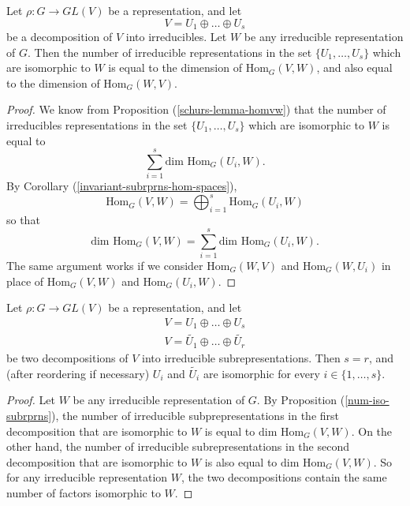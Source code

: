 \begin{prop}\label{num-iso-subrprns}
Let $\rho \colon G \to GL(V)$ be a representation, and let \[ V = U_1 \oplus \ldots \oplus U_s \] be a decomposition of $V$ into irreducibles.  Let $W$ be any irreducible representation of $G$.  Then the number of irreducible representations in the set  $ \{ U_1, \ldots, U_s \}$ which are isomorphic to $W$ is equal to the dimension of $\text{Hom}_G(V,W)$, and also equal to the dimension of $\text{Hom}_G(W,V)$.
\end{prop}
\begin{proof}
We know from Proposition (\ref{schurs-lemma-homvw}) that the number of irreducibles representations in the set  $ \{ U_1, \ldots, U_s \}$ which are isomorphic to $W$ is equal to \[ \sum_{i=1}^s \text{dim Hom}_G(U_i,W). \]
By Corollary (\ref{invariant-subrprns-hom-spaces}), \[ \text{Hom}_G(V,W) = \bigoplus_{i=1}^s \text{Hom}_G(U_i, W) \]
so that \[  \text{dim Hom}_G(V,W) = \sum_{i=1}^s \text{dim Hom}_G(U_i, W). \]
The same argument works if we consider $\text{Hom}_G(W,V)$ and $\text{Hom}_G(W,U_i)$ in place of $\text{Hom}_G(V,W)$ and $\text{Hom}_G(U_i,W)$.
\end{proof}

\begin{thm}\label{uniqueness-of-irr-decomp}
Let $\rho \colon G \to GL(V)$ be a representation, and let
\begin{align*}
V = U_1 \oplus \ldots \oplus U_s \\
V = \widetilde{U_1} \oplus \ldots \oplus \widetilde{U_r}
\end{align*}
be two decompositions of $V$ into irreducible subrepresentations.  Then $s = r$, and (after reordering if necessary) $U_i$ and $\widetilde{U_i}$ are isomorphic for every $i \in \{1, \ldots, s\}$.
\end{thm}
\begin{proof}
Let $W$ be any irreducible representation of $G$.  By Proposition (\ref{num-iso-subrprns}), the number of irreducible subprepresentations in the first decomposition that are isomorphic to $W$ is equal to $\text{dim Hom}_G(V,W)$.  On the other hand, the number of irreducible subrepresentations in the second decomposition that are isomorphic to $W$ is also equal to $\text{dim Hom}_G(V,W)$.  So for any irreducible representation $W$, the two decompositions contain the same number of factors isomorphic to $W$.
\end{proof}


